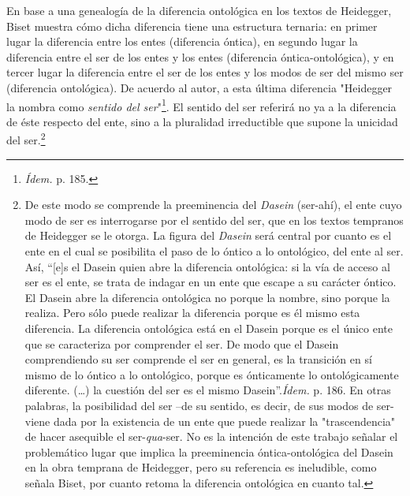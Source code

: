 \documentclass{book}
\begin{document}
En base a una genealogía de la diferencia ontológica en los textos de
Heidegger, Biset muestra cómo dicha diferencia tiene una estructura
ternaria: en primer lugar la diferencia entre los entes (diferencia
óntica), en segundo lugar la diferencia entre el ser de los entes y los
entes (diferencia óntica-ontológica), y en tercer lugar la diferencia
entre el ser de los entes y los modos de ser del mismo ser (diferencia
ontológica). De acuerdo al autor, a esta última diferencia "Heidegger la
nombra como \emph{sentido del ser}"\footnote{\emph{Ídem.} p. 185.}. El
sentido del ser referirá no ya a la diferencia de éste respecto del
ente, sino a la pluralidad irreductible que supone la unicidad del
ser.\footnote{De este modo se comprende la preeminencia del
  \emph{Dasein} (ser-ahí), el ente cuyo modo de ser es interrogarse por
  el sentido del ser, que en los textos tempranos de Heidegger se le
  otorga. La figura del \emph{Dasein} será central por cuanto es el ente
  en el cual se posibilita el paso de lo óntico a lo ontológico, del
  ente al ser. Así, ``{[}e{]}s el Dasein quien abre la diferencia
  ontológica: si la vía de acceso al ser es el ente, se trata de indagar
  en un ente que escape a su carácter óntico. El Dasein abre la
  diferencia ontológica no porque la nombre, sino porque la realiza.
  Pero sólo puede realizar la diferencia porque es él mismo esta
  diferencia. La diferencia ontológica está en el Dasein porque es el
  único ente que se caracteriza por comprender el ser. De modo que el
  Dasein comprendiendo su ser comprende el ser en general, es la
  transición en sí mismo de lo óntico a lo ontológico, porque es
  ónticamente lo ontológicamente diferente. (\dots) la cuestión del
  ser es el mismo Dasein''.\emph{Ídem.} p. 186. En otras palabras, la
  posibilidad del ser --de su sentido, es decir, de sus modos de ser-
  viene dada por la existencia de un ente que puede realizar la
  "trascendencia" de hacer asequible el ser-\emph{qua}-ser. No es la
  intención de este trabajo señalar el problemático lugar que implica la
  preeminencia óntica-ontológica del Dasein en la obra temprana de
  Heidegger, pero su referencia es ineludible, como señala Biset, por
  cuanto retoma la diferencia ontológica en cuanto tal.}
\end{document}
